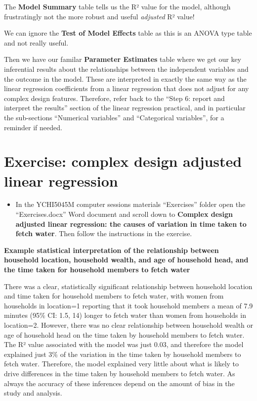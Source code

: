 \documentclass[
]{book}
\providecommand{\tightlist}{%
  \setlength{\itemsep}{0pt}\setlength{\parskip}{0pt}}
\begin{document}
The \textbf{Model Summary} table tells us the R² value for the model, although frustratingly not the more robust and useful \emph{adjusted} R² value!

We can ignore the \textbf{Test of Model Effects} table as this is an ANOVA type table and not really useful.

Then we have our familar \textbf{Parameter Estimates} table where we get our key inferential results about the relationships between the independent variables and the outcome in the model. These are interpreted in exactly the same way as the linear regression coefficients from a linear regression that does not adjust for any complex design features. Therefore, refer back to the ``Step 6: report and interpret the results'' section of the linear regression practical, and in particular the sub-sections ``Numerical variables'' and ``Categorical variables'', for a reminder if needed.

\hypertarget{exercise-complex-design-adjusted-linear-regression}{%
\section{Exercise: complex design adjusted linear regression}\label{exercise-complex-design-adjusted-linear-regression}}

\begin{itemize}
\tightlist
\item
  In the YCHI5045M computer sessions materials ``Exercises'' folder open the ``Exercises.docx'' Word document and scroll down to \textbf{Complex design adjusted linear regression: the causes of variation in time taken to fetch water}. Then follow the instructions in the exercise.
\end{itemize}

\textbf{Example statistical interpretation of the relationship between household location, household wealth, and age of household head, and the time taken for household members to fetch water}

There was a clear, statistically significant relationship between household location and time taken for household members to fetch water, with women from households in location=1 reporting that it took household members a mean of 7.9 minutes (95\% CI: 1.5, 14) longer to fetch water than women from households in location=2. However, there was no clear relationship between household wealth or age of household head on the time taken by household members to fetch water. The R² value associated with the model was just 0.03, and therefore the model explained just 3\% of the variation in the time taken by household members to fetch water. Therefore, the model explained very little about what is likely to drive differences in the time taken by household members to fetch water. As always the accuracy of these inferences depend on the amount of bias in the study and analysis.
\end{document}
